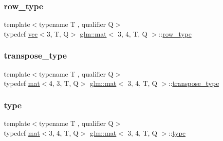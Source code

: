 \subsubsection{\texorpdfstring{row\+\_\+type}{row\_type}}
{\footnotesize\ttfamily template$<$typename T , qualifier Q$>$ \\
typedef \mbox{\hyperlink{structglm_1_1vec}{vec}}$<$3, T, Q$>$ \mbox{\hyperlink{structglm_1_1mat}{glm\+::mat}}$<$ 3, 4, T, Q $>$\+::\mbox{\hyperlink{structglm_1_1mat_3_013_00_014_00_01_t_00_01_q_01_4_a14121d7d6181d3e9eea914373f795c6c}{row\+\_\+type}}}

\mbox{\label{structglm_1_1mat_3_013_00_014_00_01_t_00_01_q_01_4_af38d159b4f750dd5fab7d19b44c82731}} 
\subsubsection{\texorpdfstring{transpose\+\_\+type}{transpose\_type}}
{\footnotesize\ttfamily template$<$typename T , qualifier Q$>$ \\
typedef \mbox{\hyperlink{structglm_1_1mat}{mat}}$<$4, 3, T, Q$>$ \mbox{\hyperlink{structglm_1_1mat}{glm\+::mat}}$<$ 3, 4, T, Q $>$\+::\mbox{\hyperlink{structglm_1_1mat_3_013_00_014_00_01_t_00_01_q_01_4_af38d159b4f750dd5fab7d19b44c82731}{transpose\+\_\+type}}}

\mbox{\label{structglm_1_1mat_3_013_00_014_00_01_t_00_01_q_01_4_a6742d5174ea43a0298a2bceb2636736a}} 
\subsubsection{\texorpdfstring{type}{type}}
{\footnotesize\ttfamily template$<$typename T , qualifier Q$>$ \\
typedef \mbox{\hyperlink{structglm_1_1mat}{mat}}$<$3, 4, T, Q$>$ \mbox{\hyperlink{structglm_1_1mat}{glm\+::mat}}$<$ 3, 4, T, Q $>$\+::\mbox{\hyperlink{structglm_1_1mat_3_013_00_014_00_01_t_00_01_q_01_4_a6742d5174ea43a0298a2bceb2636736a}{type}}}


